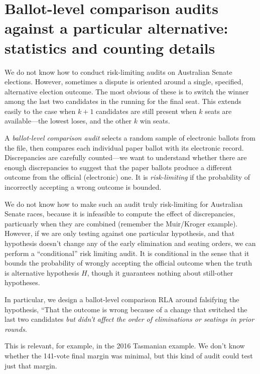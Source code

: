 \documentclass[10pt,a4paper]{article}
\newcommand{\longVersion}[1]{#1}
\newcommand{\longVersion}[1]{}
\begin{document}
\longVersion{
\section{Ballot-level comparison audits against a particular alternative: statistics and counting details} \label{sec:conditionalRLAs}

We do not know how to conduct risk-limiting audits on Australian Senate elections.  However, sometimes a dispute is oriented around a single, specified, alternative election outcome.  The most obvious of these is to switch the winner among the last two candidates in the running for the final seat.  This extends easily to the case when $k+1$ candidates are still present when $k$ seats are available---the lowest loses, and the other $k$ win seats. 


A \emph{ballot-level comparison audit} selects a random sample of electronic ballots from the file, then compares each individual paper ballot with its electronic record.  Discrepancies are carefully counted---we want to understand whether there are enough discrepancies to suggest that the paper ballots produce a different outcome from the official (electronic) one.   It is \emph{risk-limiting} if the probability of incorrectly accepting a wrong outcome is bounded.

We do not know how to make such an audit truly risk-limiting for Australian Senate races, because it is infeasible to compute the effect of discrepancies, particuarly when they are combined (remember the Muir/Kroger example).  However, if we are only testing against one particular hypothesis, and that hypothesis doesn't change any of the early elimination and seating orders, we can perform a ``conditional'' risk limiting audit.  It is conditional in the sense that it bounds the probability of wrongly accepting the official outcome when the truth is alternative hypothesis $H$, though it guarantees nothing about still-other hypotheses.

In particular, we design a ballot-level comparison RLA around falsifying the hypothesis, ``That the outcome is wrong because of a change that switched the last two candidates \emph{but didn't affect the order of eliminations or seatings in prior rounds.}

This is relevant, for example, in the 2016 Tasmanian example.  We don't know whether the 141-vote final margin was minimal, but this kind of audit could test just that margin.

}
\end{document}
